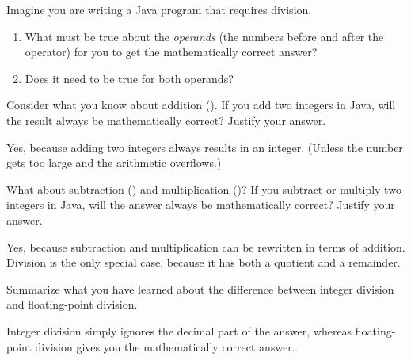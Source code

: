 \Q Imagine you are writing a Java program that requires division.

\begin{enumerate}
\item What must be true about the \emph{operands} (the numbers before and after the operator) for you to get the mathematically correct answer?


\item Does it need to be true for both operands? 
\end{enumerate}


\Q Consider what you know about addition (\java{+}).
If you add two integers in Java, will the result always be mathematically correct?
Justify your answer.

\begin{answer}[5em]
Yes, because adding two integers always results in an integer.
(Unless the number gets too large and the arithmetic overflows.)
\end{answer}


\Q What about subtraction (\java{-}) and multiplication (\java{*})? If you subtract or multiply two integers in Java, will the answer always be mathematically correct? Justify your answer.

\begin{answer}[5em]
Yes, because subtraction and multiplication can be rewritten in terms of addition.
Division is the only special case, because it has both a quotient and a remainder.
\end{answer}


\Q Summarize what you have learned about the difference between integer division and floating-point division.

\begin{answer}[5em]
Integer division simply ignores the decimal part of the answer, whereas floating-point division gives you the mathematically correct answer.
\end{answer}
